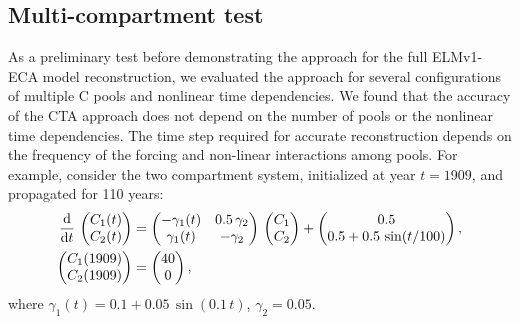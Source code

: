 \documentclass[draft]{agujournal2019}
\newcommand{\deriv}[1]{\frac{\mathrm{d}}{\mathrm{d}#1}}
\begin{document}
\subsection{Multi-compartment test}
    As a preliminary test before demonstrating the approach for the full ELMv1-ECA model reconstruction, we evaluated the approach for several configurations of multiple C pools and nonlinear time dependencies. We found that the accuracy of the CTA approach does not depend on the number of pools or the nonlinear time dependencies. The time step required for accurate reconstruction depends on the frequency of the forcing and non-linear interactions among pools. For example, consider the two compartment system, initialized at year $t=1909$, and propagated for 110 years:
    \begin{equation}\label{eqn:CS_two_dim_example}
        \begingroup\makeatletter\def\f@size{10}\check@mathfonts
        \begin{aligned}
            \deriv{t}\,\begin{pmatrix} C_1(t) \\ C_2(t) \end{pmatrix} &= 
            \begin{pmatrix} -\gamma_1(t) & 0.5\,\gamma_2 \\ \gamma_1(t) & -\gamma_2 \end{pmatrix} \,
            \begin{pmatrix} C_1 \\ C_2 \end{pmatrix} +  
            \begin{pmatrix} 0.5 \\ 0.5 + 0.5\,\sin(t/100) \end{pmatrix},\\
            \begin{pmatrix} C_1(1909) \\ C_2(1909) \end{pmatrix} &=
            \begin{pmatrix} 40 \\ 0 \end{pmatrix},
        \end{aligned}
        \endgroup
    \end{equation}
    where $\gamma_1(t)=0.1+0.05\,\sin(0.1\,t)$, $\gamma_2=0.05$.
    
\end{document}

